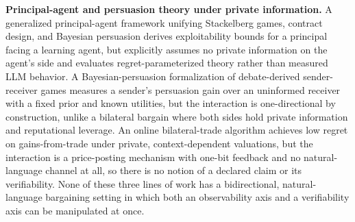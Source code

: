 \documentclass[11pt]{article}
\begin{document}
\textbf{Principal-agent and persuasion theory under private information.} A generalized principal-agent framework unifying Stackelberg games, contract design, and Bayesian persuasion \citep{LearningAgentPA} derives exploitability bounds for a principal facing a learning agent, but explicitly assumes no private information on the agent's side and evaluates regret-parameterized theory rather than measured LLM behavior. A Bayesian-persuasion formalization of debate-derived sender-receiver games \citep{StrategicPersuasion} measures a sender's persuasion gain over an uninformed receiver with a fixed prior and known utilities, but the interaction is one-directional by construction, unlike a bilateral bargain where both sides hold private information and reputational leverage. An online bilateral-trade algorithm \citep{ContextualBilateralTrade} achieves low regret on gains-from-trade under private, context-dependent valuations, but the interaction is a price-posting mechanism with one-bit feedback and no natural-language channel at all, so there is no notion of a declared claim or its verifiability. None of these three lines of work has a bidirectional, natural-language bargaining setting in which both an observability axis and a verifiability axis can be manipulated at once.
\end{document}
